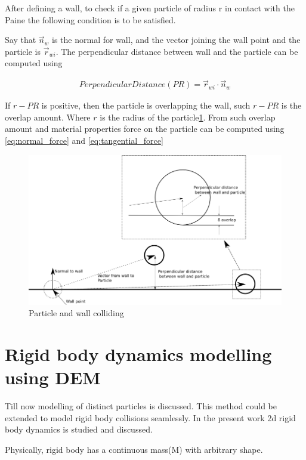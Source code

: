After defining a wall, to check if a given particle of radius r in
contact with the Paine the following condition is to be satisfied.

Say that $\vec{n}_w$ is the normal for wall, and the vector joining
the wall point and the particle is $\vec{r}_{wi}$. The perpendicular
distance between wall and the particle can be computed using

\begin{align}
  \label{eq:perpendicular_dist}
    Perpendicular Distance(PR) =  \vec{r}_{wi} \cdot  \vec{n}_w
\end{align}

If $r - PR $ is positive, then the particle is overlapping the wall,
such $r - PR$ is the overlap amount. Where $r$ is the radius of the
particle\ref{fig:particle_wall_collision}. From such overlap amount
and material properties force on the particle can be computed using
\eqref{eq:normal_force} and \eqref{eq:tangential_force}

\begin{figure}
  \centering
  \includegraphics[scale=1.5]{dem/particle_wall_collision.png}
  \caption{Particle and wall colliding}
  \label{fig:particle_wall_collision}
\end{figure}


\section{Rigid body dynamics modelling using DEM}
\label{sec:rigid_body_dem}

Till now modelling of distinct particles is discussed. This method could be
extended to model rigid body collisions seamlessly. In the present work
2d rigid body dynamics is studied and discussed.

Physically, rigid body has a continuous mass(M) with arbitrary shape.





